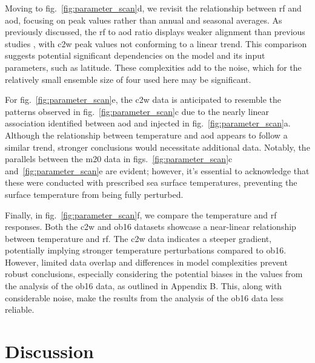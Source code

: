 \documentclass{ametsocV6.1}
\newcommand{\iso}[1][i]{{#1}njected \ce{SO2}}
\begin{document}
Moving to fig.~\ref{fig:parameter_scan}d, we revisit the relationship between \gls{rf}
and \gls{aod}, focusing on peak values rather than annual and seasonal averages. As
previously discussed, the \gls{rf} to \gls{aod} ratio displays weaker alignment than
previous studies \citep{jones2005, marshall2020, timmreck2010}, with \gls{c2w} peak
values not conforming to a linear trend. This comparison suggests potential significant
dependencies on the model and its input parameters, such as latitude. These complexities
add to the noise, which for the relatively small ensemble size of four used here may be
significant.

For fig.~\ref{fig:parameter_scan}e, the \gls{c2w} data is anticipated to resemble the
patterns observed in fig.~\ref{fig:parameter_scan}c due to the nearly linear association
identified between \gls{aod} and \iso{} in fig.~\ref{fig:parameter_scan}a. Although the
relationship between temperature and \gls{aod} appears to follow a similar trend,
stronger conclusions would necessitate additional data. Notably, the parallels between
the \gls{m20} data in figs.~\ref{fig:parameter_scan}c and~\ref{fig:parameter_scan}e are
evident; however, it's essential to acknowledge that these were conducted with
prescribed sea surface temperatures, preventing the surface temperature from being fully
perturbed.

Finally, in fig.~\ref{fig:parameter_scan}f, we compare the temperature and \gls{rf}
responses. Both the \gls{c2w} and \gls{ob16} datasets showcase a near-linear
relationship between temperature and \gls{rf}. The \gls{c2w} data indicates a steeper
gradient, potentially implying stronger temperature perturbations compared to
\gls{ob16}. However, limited data overlap and differences in model complexities prevent
robust conclusions, especially considering the potential biases in the values from the
analysis of the \gls{ob16} data, as outlined in Appendix B. This, along with
considerable noise, make the results from the analysis of the \gls{ob16} data less
reliable.

\section{Discussion}\label{sec:discussion}

\end{document}
